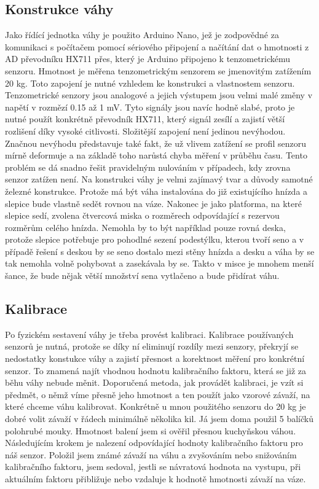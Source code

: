 \subsection*{Konstrukce váhy}
Jako řídící jednotka váhy je použito Arduino Nano, jež je zodpovědné za komunikaci s počítačem pomocí sériového připojení a načítání dat o hmotnosti z AD převodníku HX711 přes, který je Arduino připojeno k tenzometrickému senzoru.
Hmotnost je měřena tenzometrickým senzorem se jmenovitým zatížením 20 kg.
Toto zapojení je nutné vzhledem ke konstrukci a vlastnostem senzoru.
Tenzometrické senzory jsou analogové a jejich výstupem jsou velmi malé změny v napětí v rozmězí 0.15 až 1 mV.
Tyto signály jsou navíc hodně slabé, proto je nutné použít konkrétně převodník HX711, který signál zesílí a zajistí větší rozlišení díky vysoké citlivosti.
Složitější zapojení není jedinou nevýhodou.
Značnou nevýhodu představuje také fakt, že už vlivem zatížení se profil senzoru mírně deformuje a na základě toho narůstá chyba měření v průběhu času.
Tento problém se dá snadno řešit pravidelným nulováním v případech, kdy zrovna senzor zatížen není.
Na konstrukci váhy je velmi zajímavý tvar a důvody samotné železné konstrukce.
Protože má být váha instalována do již existujícího hnízda a slepice bude vlastně sedět rovnou na váze.
Nakonec je jako platforma, na které slepice sedí, zvolena čtvercová miska o rozměrech odpovídající s rezervou rozměrům celého hnízda.
Nemohla by to být například pouze rovná deska, protože slepice potřebuje pro pohodlné sezení podestýlku, kterou tvoří seno a v případě řešení s deskou by se seno dostalo mezi stěny hnízda a desku a váha by se tak nemohla volně pohybovat a zasekávala by se.
Takto v misce je mnohem menší šance, že bude nějak větší množství sena vytlačeno a bude přidírat váhu.

\subsection*{Kalibrace}
Po fyzickém sestavení váhy je třeba provést kalibraci.
Kalibrace používaných senzorů je nutná, protože se díky ní eliminují rozdíly mezi senzory, překryjí se nedostatky konstukce váhy a zajistí přesnost a korektnost měření pro konkrétní senzor.
To znamená najít vhodnou hodnotu kalibračního faktoru, která se již za běhu váhy nebude měnit.
Doporučená metoda, jak provádět kalibraci, je vzít si předmět, o němž víme přesně jeho hmotnost a ten použít jako vzorové závaží, na které chceme váhu kalibrovat.
Konkrétně u mnou použitého senzoru do 20 kg je dobré volit závaží v řádech minimálně několika kil.
Já jsem doma použil 5 balíčků polohrubé mouky.
Hmotnost balení jsem si ověřil přesnou kuchyňskou váhou.
Následujícím krokem je nalezení odpovídající hodnoty kalibračního faktoru pro náš senzor.
Položil jsem známé závaží na váhu a zvyšováním nebo snižováním kalibračního faktoru, jsem sedoval, jestli se návratová hodnota na vystupu, při aktuálním faktoru přibližuje nebo vzdaluje k hodnotě hmotnosti závaží na váze.

